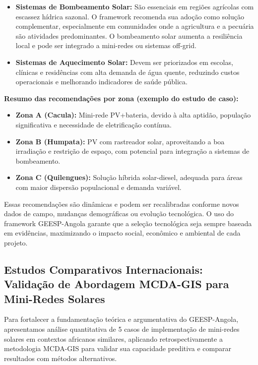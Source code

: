 \documentclass[12pt, a4paper]{article}
\begin{document}
\begin{itemize}
  \item \textbf{Sistemas de Bombeamento Solar:} São essenciais em regiões agrícolas com escassez hídrica sazonal. O framework recomenda sua adoção como solução complementar, especialmente em comunidades onde a agricultura e a pecuária são atividades predominantes. O bombeamento solar aumenta a resiliência local e pode ser integrado a mini-redes ou sistemas off-grid.

  \item \textbf{Sistemas de Aquecimento Solar:} Devem ser priorizados em escolas, clínicas e residências com alta demanda de água quente, reduzindo custos operacionais e melhorando indicadores de saúde pública.
\end{itemize}

\textbf{Resumo das recomendações por zona (exemplo do estudo de caso):}
\begin{itemize}
  \item \textbf{Zona A (Cacula):} Mini-rede PV+bateria, devido à alta aptidão, população significativa e necessidade de eletrificação contínua.
  \item \textbf{Zona B (Humpata):} PV com rastreador solar, aproveitando a boa irradiação e restrição de espaço, com potencial para integração a sistemas de bombeamento.
  \item \textbf{Zona C (Quilengues):} Solução híbrida solar-diesel, adequada para áreas com maior dispersão populacional e demanda variável.
\end{itemize}

Essas recomendações são dinâmicas e podem ser recalibradas conforme novos dados de campo, mudanças demográficas ou evolução tecnológica. O uso do framework GEESP-Angola garante que a seleção tecnológica seja sempre baseada em evidências, maximizando o impacto social, econômico e ambiental de cada projeto.

\subsection{Estudos Comparativos Internacionais: Validação de Abordagem MCDA-GIS para Mini-Redes Solares}

Para fortalecer a fundamentação teórica e argumentativa do GEESP-Angola, apresentamos análise quantitativa de 5 casos de implementação de mini-redes solares em contextos africanos similares, aplicando retrospectivamente a metodologia MCDA-GIS para validar sua capacidade preditiva e comparar resultados com métodos alternativos.
\end{document}
